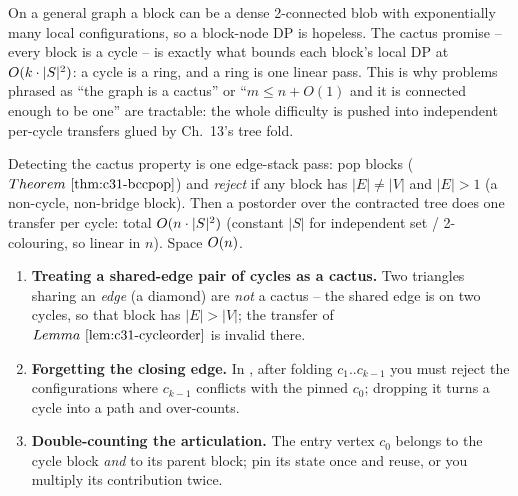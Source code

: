 \begin{insightbox}
On a general graph a block can be a dense 2-connected blob with exponentially many
local configurations, so a block-node DP is hopeless.  The cactus promise -- every
block is a cycle -- is exactly what bounds each block's local DP at
\(O(k\cdot|S|^2)\): a cycle is a ring, and a ring is one linear pass.  This is
why problems phrased as ``the graph is a cactus'' or ``\(m\le n+O(1)\) and it is
connected enough to be one'' are tractable: the whole difficulty is pushed into
independent per-cycle transfers glued by Ch.~13's tree fold.
\end{insightbox}

\begin{complexitybox}[Cactus DP]
Detecting the cactus property is one edge-stack pass: pop blocks
(\(\thmref{c31-bccpop}\)) and \emph{reject} if any block has \(|E|\ne|V|\) and
\(|E|>1\) (a non-cycle, non-bridge block).  Then a postorder over the contracted
tree does one transfer per cycle: total \(O(n\cdot|S|^2)\) (constant
\(|S|\) for independent set / 2-colouring, so linear in \(n\)).  Space \(O(n)\).
\end{complexitybox}

\begin{warningbox}
\begin{enumerate}[nosep,leftmargin=1.6em]
  \item \textbf{Treating a shared-edge pair of cycles as a cactus.} Two triangles
        sharing an \emph{edge} (a diamond) are \emph{not} a cactus -- the shared edge is
        on two cycles, so that block has \(|E|>|V|\); the transfer of
        \(\lemref{c31-cycleorder}\) is invalid there.
  \item \textbf{Forgetting the closing edge.} In , after folding
        \(c_1..c_{k-1}\) you must reject the configurations where \(c_{k-1}\) conflicts
        with the pinned \(c_0\); dropping it turns a cycle into a path and over-counts.
  \item \textbf{Double-counting the articulation.} The entry vertex \(c_0\) belongs to
        the cycle block \emph{and} to its parent block; pin its state once and reuse, or
        you multiply its contribution twice.
\end{enumerate}
\end{warningbox}

